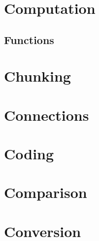 \documentclass[a4paper]{article}
\begin{document}
\section{Computation}

\subsection{Functions}


\section{Chunking}

\section{Connections}

\section{Coding}

\section{Comparison}

\section{Conversion}
\end{document}
